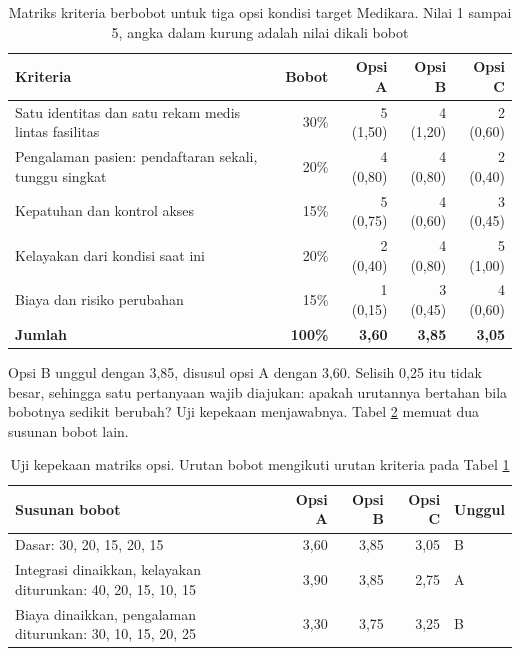 \begin{table}[!htb]
  \centering
  \caption{Matriks kriteria berbobot untuk tiga opsi kondisi target Medikara. Nilai 1
           sampai 5, angka dalam kurung adalah nilai dikali bobot}
  \label{tab:ch08-matriks-opsi}
  \begin{tabularx}{\textwidth}{>{\raggedright\arraybackslash}Xrrrr}
    \hline
    \textbf{Kriteria} & \textbf{Bobot} & \textbf{Opsi A} & \textbf{Opsi B} & \textbf{Opsi C} \\
    \hline
    Satu identitas dan satu rekam medis lintas fasilitas & 30\% & 5 (1,50) & 4 (1,20) &
      2 (0,60) \\
    \hline
    Pengalaman pasien: pendaftaran sekali, tunggu singkat & 20\% & 4 (0,80) & 4 (0,80) &
      2 (0,40) \\
    \hline
    Kepatuhan dan kontrol akses & 15\% & 5 (0,75) & 4 (0,60) & 3 (0,45) \\
    \hline
    Kelayakan dari kondisi saat ini & 20\% & 2 (0,40) & 4 (0,80) & 5 (1,00) \\
    \hline
    Biaya dan risiko perubahan & 15\% & 1 (0,15) & 3 (0,45) & 4 (0,60) \\
    \hline
    \textbf{Jumlah} & \textbf{100\%} & \textbf{3,60} & \textbf{3,85} & \textbf{3,05} \\
    \hline
  \end{tabularx}
\end{table}

Opsi B unggul dengan 3,85, disusul opsi A dengan 3,60. Selisih 0,25 itu tidak besar,
sehingga satu pertanyaan wajib diajukan: apakah urutannya bertahan bila bobotnya sedikit
berubah? Uji kepekaan menjawabnya. Tabel \ref{tab:ch08-kepekaan} memuat dua susunan bobot
lain.

\begin{table}[!htb]
  \centering
  \caption{Uji kepekaan matriks opsi. Urutan bobot mengikuti urutan kriteria pada Tabel
           \ref{tab:ch08-matriks-opsi}}
  \label{tab:ch08-kepekaan}
  \begin{tabularx}{\textwidth}{>{\raggedright\arraybackslash}Xrrrl}
    \hline
    \textbf{Susunan bobot} & \textbf{Opsi A} & \textbf{Opsi B} & \textbf{Opsi C} &
      \textbf{Unggul} \\
    \hline
    Dasar: 30, 20, 15, 20, 15 & 3,60 & 3,85 & 3,05 & B \\
    \hline
    Integrasi dinaikkan, kelayakan diturunkan: 40, 20, 15, 10, 15 & 3,90 & 3,85 & 2,75 & A \\
    \hline
    Biaya dinaikkan, pengalaman diturunkan: 30, 10, 15, 20, 25 & 3,30 & 3,75 & 3,25 & B \\
    \hline
  \end{tabularx}
\end{table}

